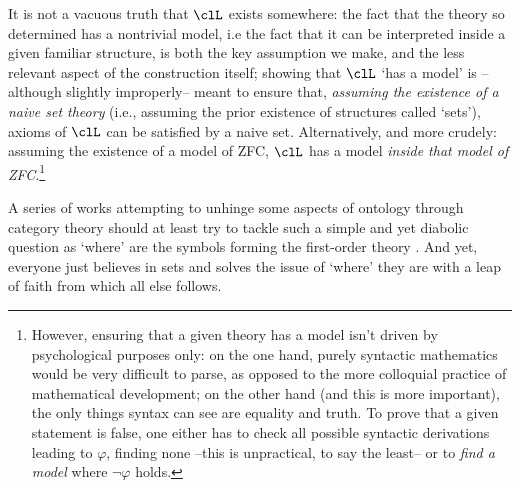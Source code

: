 It is not a vacuous truth that $\clL$ exists somewhere: the fact that the theory so determined has a nontrivial model, i.e the fact that it can be interpreted inside a given familiar structure, is both the key assumption we make, and the less relevant aspect of the construction itself; showing that $\clL$ `has a model' is --although slightly improperly-- meant to ensure that, \emph{assuming the existence of a naive set theory} (i.e., assuming the prior existence of structures called `sets'), axioms of $\clL$ can be satisfied by a naive set. Alternatively, and more crudely: assuming the existence of a model of ZFC, $\clL$ has a model \emph{inside that model of ZFC}.\footnote{However, ensuring that a given theory has a model isn't driven by psychological purposes only: on the one hand, purely syntactic mathematics would be very difficult to parse, as opposed to the more colloquial practice of mathematical development; on the other hand (and this is more important), the only things syntax can see are equality and truth. To prove that a given statement is false, one either has to check all possible syntactic derivations leading to $\varphi$, finding none --this is unpractical, to say the least-- or to \emph{find a model} where $\lnot\varphi$ holds.}

A series of works attempting to unhinge some aspects of ontology through category theory should at least try to tackle such a simple and yet diabolic question as `where' are the symbols forming the first-order theory . And yet, everyone just believes in sets and solves the issue of `where' they are with a leap of faith from which all else follows.

